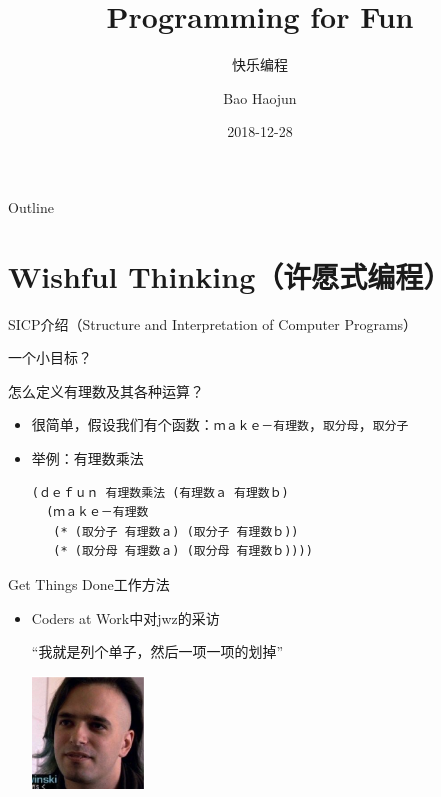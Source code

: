 \documentclass[presentation,dvipdfmx,CJKbookmarks]{beamer}
\author{Bao Haojun}
\date{2018-12-28}
\title{Programming for Fun}
\subtitle{快乐编程}
\begin{document}
\begin{CJK*}{UTF8}{simsun}

\maketitle
\begin{frame}{Outline}
\tableofcontents
\end{frame}

\CJKtilde

\section{Wishful Thinking（许愿式编程）}
\label{sec:org418e153}

\begin{frame}[fragile,label={sec:org63cbb01}]{SICP\thinspace 介绍（Structure and Interpretation of Computer Programs）}
 \begin{block}{一个小目标？}
\pause
\end{block}
\begin{block}{怎么定义有理数及其各种运算？}
\pause
\begin{itemize}[<+->]
\item 很简单，假设我们有\thinspace 个函数：\texttt{ｍａｋｅ－有理数}，\texttt{取分母}，\texttt{取分子}
\item 举例：有理数乘法

\begin{verbatim}
(ｄｅｆｕｎ 有理数乘法 (有理数ａ 有理数ｂ)
  (ｍａｋｅ－有理数
   (* (取分子 有理数ａ) (取分子 有理数ｂ))
   (* (取分母 有理数ａ) (取分母 有理数ｂ))))
\end{verbatim}
\end{itemize}
\end{block}
\end{frame}

\begin{frame}[label={sec:org4e282a9}]{Get Things Done\thinspace 工作方法}
\pause
\begin{itemize}[<+->]
\item Coders at Work\thinspace 中对\thinspace jwz\thinspace 的采访

“我就是列个单子，然后一项一项的划掉”

\begin{center}
\includegraphics[width=3cm]{./jwz.ps}
\end{center}


\end{itemize}
\end{frame}
\end{CJK*}
\end{document}
